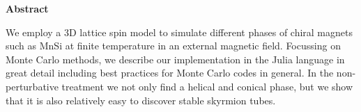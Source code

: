 %
\phantom{}
\bigskip
\bigskip
\bigskip
%
\begin{center}
{\sffamily \bfseries \huge Abstract}
\end{center}
%
\bigskip
\bigskip
%
We employ a 3D lattice spin model to simulate different phases of chiral magnets
such as MnSi at finite temperature in an external magnetic field.  Focussing on
Monte Carlo methods, we describe our implementation in the Julia language in
great detail including best practices for Monte Carlo codes in general. In the
non-perturbative treatment we not only find a helical and conical phase, but we
show that it is also relatively easy to discover stable skyrmion tubes.

\todo{}
%
